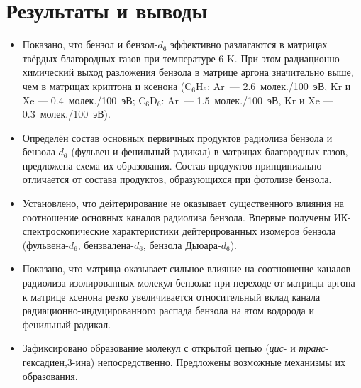 \newpage
\section{Результаты и выводы}
\begin{itemize}
\item Показано, что бензол и бензол-$d_6$ эффективно разлагаются в матрицах твёрдых благородных газов при температуре 6 K. При этом радиационно-химический выход разложения бензола в матрице аргона значительно выше, чем в матрицах криптона и ксенона (C$_6$H$_6$: Ar~--- 2.6~молек./100~эВ, Kr и Xe --- 0.4~молек./100~эВ; C$_6$D$_6$: Ar~--- 1.5~молек./100~эВ, Kr и Xe --- 0.3~молек./100~эВ).
\item Определён состав основных первичных продуктов радиолиза бензола и бензола-$d_6$ (фульвен и фенильный радикал) в матрицах благородных газов, предложена схема их образования. Состав продуктов принципиально отличается от состава продуктов, образующихся при фотолизе бензола.
\item Установлено, что дейтерирование не оказывает существенного влияния на соотношение основных каналов радиолиза бензола. Впервые получены ИК-спектроскопические характеристики дейтерированных изомеров бензола (фульвена-$d_6$, бензвалена-$d_6$, бензола Дьюара-$d_6$).
\item Показано, что матрица оказывает сильное влияние на соотношение каналов радиолиза изолированных молекул бензола: при переходе от матрицы аргона к матрице ксенона резко увеличивается относительный вклад канала радиационно-индуцированного распада бензола на атом водорода и фенильный радикал.
 \item Зафиксировано образование молекул с открытой цепью ({\itshape цис}- и {\itshape транс}-гексадиен,3\nobreakdash-ина) непосредственно. Предложены возможные механизмы их образования.
\end{itemize}

